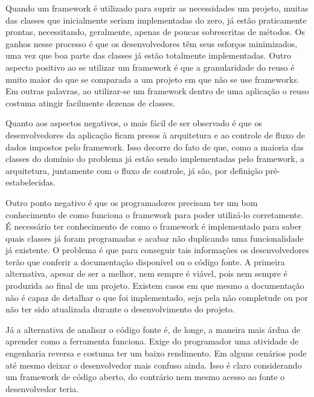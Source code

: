 \documentclass[
    12pt,       %
    openright,      %
    twoside,      %
    a4paper,      %
    english,      %
    french,       %
    spanish,      %
    brazil,       %
    ]{abntex2}
\begin{document}
          Quando um framework é utilizado para suprir as necessidades um projeto, muitas
          das classes que inicialmente seriam implementadas do zero, já estão praticamente
          prontas, necessitando, geralmente, apenas de poucas sobrescritas de métodos.
          Os ganhos nesse processo é que os desenvolvedores têm seus esforços
          minimizados, uma vez que boa parte das classes já estão totalmente implementadas.
          Outro aspecto positivo ao se utilizar um framework é que a granularidade do
          reuso é muito maior do que se comparada a um projeto em que não se use frameworks.
          Em outras palavras, ao utilizar-se um framework dentro de uma aplicação o reuso
          costuma atingir facilmente dezenas de classes.

          Quanto aos aspectos negativos, o mais fácil de ser observado é que os
          desenvolvedores da aplicação ficam presos à arquitetura e ao controle
          de fluxo de dados impostos pelo framework. Isso decorre do fato de que, como a
          maioria das classes do domínio do problema já estão sendo implementadas pelo
          framework, a arquitetura, juntamente com o fluxo de controle, já são, por
          definição pré-estabelecidas.

          Outro ponto negativo é que os programadores precisam ter um bom conhecimento
          de como funciona o framework para poder utilizá-lo corretamente. É necessário
          ter conhecimento de como o framework é implementado para saber quais classes
          já foram programadas e acabar não duplicando uma funcionalidade já existente.
          O problema é que para conseguir tais informações os desenvolvedores terão que
          conferir a documentação disponível ou o código fonte. A primeira alternativa,
          apesar de ser a melhor, nem sempre é viável, pois nem sempre é produzida ao
          final de um projeto. Existem casos em que mesmo a documentação não é capaz
          de detalhar o que foi implementado, seja pela não completude ou por não ter
          sido atualizada durante o desenvolvimento do projeto.

          Já a alternativa de analisar o código fonte é, de longe, a maneira mais árdua
          de aprender como a ferramenta funciona. Exige do programador uma atividade
          de engenharia reversa e costuma ter um baixo rendimento. Em alguns cenários
          pode até mesmo deixar o desenvolvedor mais confuso ainda. Isso é claro
          considerando um framework de código aberto, do contrário nem mesmo acesso
          ao fonte o desenvolvedor teria.
\end{document}
